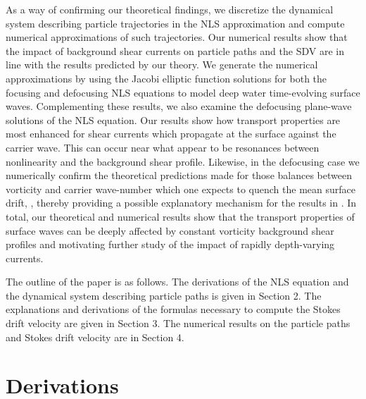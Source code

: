 \documentclass{JFM_Style/jfm}
\begin{document}

As a way of confirming our theoretical findings, we discretize the dynamical system describing particle trajectories in the NLS approximation and compute numerical approximations of such trajectories. Our numerical results show that the impact of background shear currents on particle paths and the SDV are in line with the results predicted by our theory. We generate the numerical approximations by using the Jacobi elliptic function solutions for both the focusing and defocusing NLS equations to model deep water time-evolving surface waves.  Complementing these results, we also examine the defocusing plane-wave solutions of the NLS equation.  Our results show how transport properties are most enhanced for shear currents which propagate at the surface against the carrier wave.  This can occur near what appear to be resonances between nonlinearity and the background shear profile.  Likewise, in the defocusing case we numerically confirm the theoretical predictions made for those balances between vorticity and carrier wave-number which one expects to quench the mean surface drift, , thereby providing a possible explanatory mechanism for the results in \cite{smith,breivik,monismith}.  In total, our theoretical and numerical results show that the transport properties of surface waves can be deeply affected by constant vorticity background shear profiles and motivating further study of the impact of rapidly depth-varying currents.  

The outline of the paper is as follows.  The derivations of the NLS equation and the dynamical system describing particle paths is given in Section 2.  The explanations and derivations of the formulas necessary to compute the Stokes drift velocity are given in Section 3.  The numerical results on the particle paths and Stokes drift velocity are in Section 4. 
\section{Derivations}
\end{document}
